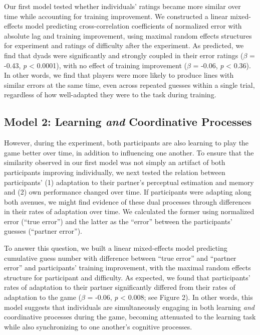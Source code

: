 \documentclass[10pt, letterpaper]{article}
\begin{document}
Our first model tested whether individuals' ratings became more similar
over time while accounting for training improvement. We constructed a
linear mixed-effects model predicting cross-correlation coefficients of
normalized error with absolute lag and training improvement, using
maximal random effects structures for experiment and ratings of
difficulty after the experiment. As predicted, we find that dyads were
significantly and strongly coupled in their error ratings
(\emph{\(\beta\)} = -0.43, \emph{p} \textless{} 0.0001), with no effect
of training improvement (\emph{\(\beta\)} = -0.06, \emph{p} \textless{}
0.36). In other words, we find that players were more likely to produce
lines with similar errors at the same time, even across repeated guesses
within a single trial, regardless of how well-adapted they were to the
task during training.

\subsection{\texorpdfstring{Model 2: Learning \emph{and} Coordinative
Processes}{Model 2: Learning and Coordinative Processes}}\label{model-2-learning-and-coordinative-processes}

However, during the experiment, both participants are also learning to
play the game better over time, in addition to influencing one another.
To ensure that the similarity observed in our first model was not simply
an artifact of both participants improving individually, we next tested
the relation between participants' (1) adaptation to their partner's
perceptual estimation and memory and (2) own performance changed over
time. If participants were adapting along both avenues, we might find
evidence of these dual processes through differences in their rates of
adaptation over time. We calculated the former using normalized error
(``true error'') and the latter as the ``error'' between the
participants' guesses (``partner error'').

To answer this question, we built a linear mixed-effects model
predicting cumulative guess number with difference between ``true
error'' and ``partner error'' and participants' training improvement,
with the maximal random effects structure for participant and
difficulty. As expected, we found that participants' rates of adaptation
to their partner significantly differed from their rates of adaptation
to the game (\emph{\(\beta\)} = -0.06, \emph{p} \textless{} 0.008; see
Figure 2). In other words, this model suggests that individuals are
simultaneously engaging in both learning \emph{and} coordinative
processes during the game, becoming attenuated to the learning task
while also synchronizing to one another's cognitive processes.
\end{document}

